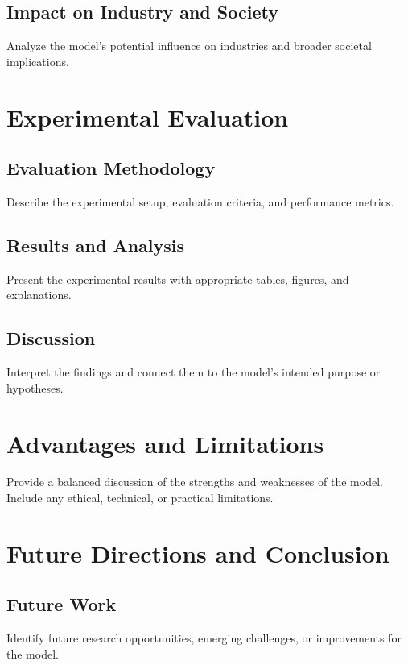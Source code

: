 \documentclass[12pt]{article}
\begin{document}
\subsection{Impact on Industry and Society}
Analyze the model’s potential influence on industries and broader societal implications.

\section{Experimental Evaluation}

\subsection{Evaluation Methodology}
Describe the experimental setup, evaluation criteria, and performance metrics.

\subsection{Results and Analysis}
Present the experimental results with appropriate tables, figures, and explanations.

\subsection{Discussion}
Interpret the findings and connect them to the model’s intended purpose or hypotheses.

\section{Advantages and Limitations}
Provide a balanced discussion of the strengths and weaknesses of the model.  
Include any ethical, technical, or practical limitations.

\section{Future Directions and Conclusion}

\subsection{Future Work}
Identify future research opportunities, emerging challenges, or improvements for the model.
\end{document}
